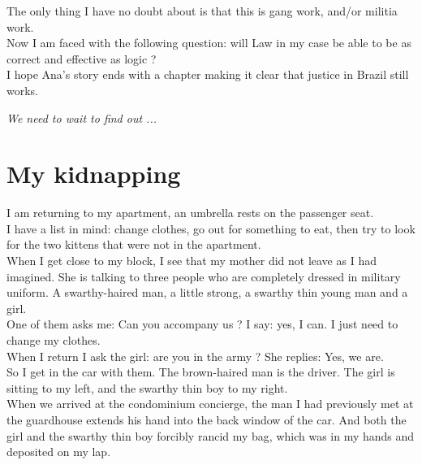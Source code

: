 \documentclass[11pt]{book}
\begin{document}
\noindent The only thing I have no doubt about is that this is gang work, and/or militia work. \\

\noindent Now I am faced with the following question: will Law in my case be able to be as correct and effective as logic ? \\

\noindent I hope Ana's story ends with a chapter making it clear that justice in Brazil still works. \\

\noindent \begin{center} \emph{We need to wait to find out ...} \end{center}

\chapter{My kidnapping}

\noindent I am returning to my apartment, an umbrella rests on the passenger seat. \\

\noindent I have a list in mind: change clothes, go out for something to eat, then try to look for the two kittens that were not in the apartment. \\

\noindent When I get close to my block, I see that my mother did not leave as I had imagined. She is talking to three people who are completely dressed in military uniform. A swarthy-haired man, a little strong, a swarthy thin young man and a girl. \\

\noindent One of them asks me: Can you accompany us ? I say: yes, I can. I just need to change my clothes. \\

\noindent When I return I ask the girl: are you in the army ? She replies: Yes, we are. \\

\noindent So I get in the car with them. The brown-haired man is the driver. The girl is sitting to my left, and the swarthy thin boy to my right. \\

\noindent When we arrived at the condominium concierge, the man I had previously met at the guardhouse extends his hand into the back window of the car. And both the girl and the swarthy thin boy forcibly rancid my bag, which was in my hands and deposited on my lap. \\
\end{document}

